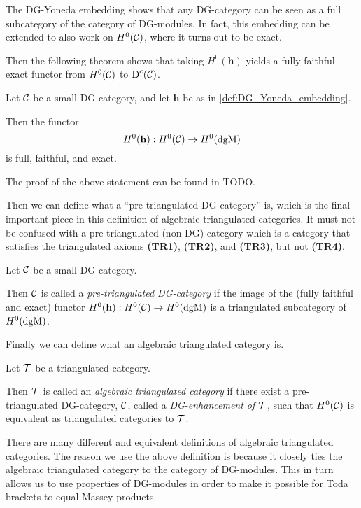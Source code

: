 The DG-Yoneda embedding shows that any DG-category can be seen as a full subcategory of the category of DG-modules. In fact, this embedding can be extended to also work on \( H^0({\mathcal{C}}) \), where it turns out to be exact.

Then the following theorem shows that taking \( H^0(\mathbf{h}) \) yields a fully faithful exact functor from \( H^0({\mathcal{C}}) \) to \( \operatorname{D}^c({\mathcal{C}}) \).

\begin{theorem}
    Let \( {\mathcal{C}} \) be a small DG-category, and let \( \mathbf{h} \) be as in \autoref{def:DG_Yoneda_embedding}.

    Then the functor
    \[
        H^0(\mathbf{h}): H^0({\mathcal{C}}) \to H^0(\operatorname{dgM})
    \]
    is full, faithful, and exact.
\end{theorem}
The proof of the above statement can be found in TODO.

Then we can define what a ``pre-triangulated DG-category'' is, which is the final important piece in this definition of algebraic triangulated categories. It must not be confused with a pre-triangulated (non-DG) category which is a category that satisfies the triangulated axioms {\bf (TR1)}, {\bf (TR2)}, and {\bf (TR3)}, but not {\bf (TR4)}.
\begin{definition}
    Let \( {\mathcal{C}} \) be a small DG-category.

    Then \( {\mathcal{C}} \) is called a \emph{pre-triangulated DG-category} if the image of the (fully faithful and exact) functor \( H^0(\mathbf{h}): H^0({\mathcal{C}}) \to H^0(\operatorname{dgM}) \) is a triangulated subcategory of \( H^0(\operatorname{dgM}) \).
\end{definition}

Finally we can define what an algebraic triangulated category is.
\begin{definition}
    \label{def:alg_tri_cat}
    Let \( {\mathcal{T}} \) be a triangulated category.

    Then \( {\mathcal{T}} \) is called an \emph{algebraic triangulated category} if there exist a pre-triangulated DG-category, \( {\mathcal{C}} \), called a \emph{DG-enhancement of \( {\mathcal{T}} \)}, such that \( H^0({\mathcal{C}}) \) is equivalent as triangulated categories to \( {\mathcal{T}} \).
\end{definition}

There are many different and equivalent definitions of algebraic triangulated categories. The reason we use the above definition is because it closely ties the algebraic triangulated category to the category of DG-modules. This in turn allows us to use properties of DG-modules in order to make it possible for Toda brackets to equal Massey products.

